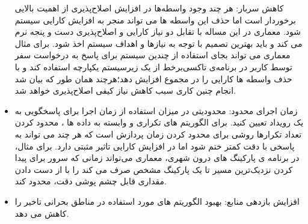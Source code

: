 \begin{itemize}
کاهش سربار: هر چند وجود واسطه‌ها در افزایش اصلاح‌پذیری از اهمیت بالایی برخوردار است اما حذف این واسطه ها می تواند منجر به افزایش کارایی سیستم شود. معماری در این مساله با تقابل دو نیاز کارایی و اصلاح‌پذیری دست و پنجه نرم می کند و باید بهترین تصمیم با توجه به نیازها و اهداف سیستم اخذ شود.
برای مثال معماری می تواند بجای استفاده از چندین سیستم برای پاسخ به درخواست سفر توسط کاربر در برنامه‌ی تاکسی‌برخط از یک زیرسیستم یکپارچه استفاده کند و با حذف واسطه ها کارایی را در مجموع افزایش دهد؛هرچند همان طور که بیان شد انجام چنین کاری سبب کاهش نیاز کیفی اصلاح‌پذیری خواهد شد.
\item
زمان اجرای محدود: محدودیتی در میزان استفاده از زمان اجرا برای پاسخگویی به یک رویداد تعیین کنید. برای الگوریتم های تکراری و وابسته به داده ها ، محدود کردن تعداد تکرارها روشی برای محدود کردن زمان پردازش است که هر چند می تواند به پاسخی با دقت کمتر ختم شود اما در افزایش کارایی تاثیر مثبتی دارد.
برای مثال، در برنامه ی پارکینگ های درون شهری، معماری می‌تواند زمانی که سرور برای پیدا کردن نزدیک‌ترین مسیر تا یک پارکینگ مشخص صرف می کند را با از دست دادن مقداری قابل چشم پوشی دقت، محدود کند.
\item
افزایش بازدهی منابع: بهبود الگوریتم های مورد استفاده در مناطق بحرانی
تاخیر را کاهش می دهد.
\end{itemize}
